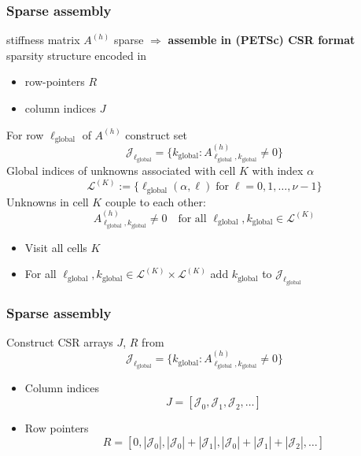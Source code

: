 \documentclass{beamer}
\begin{document}
\begin{frame}[fragile]
  \frametitle{Sparse assembly}
  stiffness matrix $A^{(h)}$ sparse $\Rightarrow$ \textbf{assemble in (PETSc) CSR format}\\[1ex]
  sparsity structure encoded in
  \begin{itemize}
    \item row-pointers $R$
    \item column indices $J$
  \end{itemize} 
  For row $\ell_{\text{global}}$ of $A^{(h)}$ construct set
  $$
  \mathcal{J}_{\ell_{\text{global}}} = \{k_{\text{global}}: A^{(h)}_{\ell_{\text{global}},k_{\text{global}}} \neq 0\}
  $$
  Global indices of unknowns associated with cell $K$ with index $\alpha$
  $$
  \mathcal{L}^{(K)} := \{\ell_{\text{global}}(\alpha,\ell)\;\text{for}\;\ell=0,1,\dots,\nu-1\}
  $$
  Unknowns in cell $K$ couple to each other:
  $$
  A^{(h)}_{\ell_{\text{global}},k_{\text{global}}} \neq 0\quad\text{for all $\ell_{\text{global}},k_{\text{global}}\in \mathcal{L}^{(K)}$}
  $$
  \vspace{-2ex}
  \begin{itemize}
    \item Visit all cells $K$
    \item For all $\ell_{\text{global}},k_{\text{global}}\in \mathcal{L}^{(K)}\times \mathcal{L}^{(K)}$ add $k_{\text{global}}$ to $\mathcal{J}_{\ell_{\text{global}}}$
  \end{itemize}  
\end{frame}


\begin{frame}[fragile]
  \frametitle{Sparse assembly}
  Construct CSR arrays $J$, $R$ from
  $$
  \mathcal{J}_{\ell_{\text{global}}} = \{k_{\text{global}}: A^{(h)}_{\ell_{\text{global}},k_{\text{global}}} \neq 0\}
  $$
  \begin{itemize}
    \item Column indices
  $$
  J = [\mathcal{J}_0,\mathcal{J}_1,\mathcal{J}_2,\dots]
  $$
    \item Row pointers
  $$
  R = [0,|\mathcal{J}_0|,|\mathcal{J}_0|+|\mathcal{J}_1|,|\mathcal{J}_0|+|\mathcal{J}_1|+|\mathcal{J}_2|,\dots]
  $$
  \end{itemize}
\end{frame}

\end{document}
